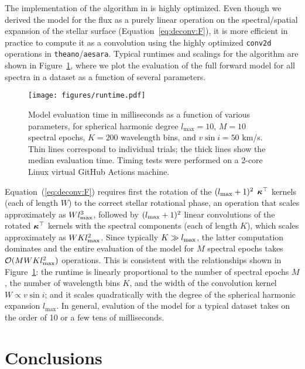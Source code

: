 \documentclass[modern]{aastex631}
\begin{document}
The implementation of the algorithm in \starry is highly optimized.
Even though we derived the model for the flux as a purely linear operation on the spectral/spatial expansion of the stellar surface (Equation~\ref{eq:deconv:F}), it is more  efficient in practice to compute it as a convolution using the highly optimized \texttt{conv2d} operations in \texttt{theano}/\texttt{aesara}.
Typical runtimes and scalings for the \starry algorithm are shown in Figure~\ref{fig:runtime}, where we plot the evaluation of the full forward model for all spectra in a dataset as a function of several parameters.
%
\begin{figure}[t!]
    \begin{centering}
        \texttt{[image: figures/runtime.pdf]}
        \caption{%
            Model evaluation time in milliseconds as a function of various parameters, for spherical harmonic degree $l_\mathrm{max} = 10$, $M = 10$ spectral epochs, $K = 200$ wavelength bins, and $v\sin i = 50$ km/s.
            Thin lines correspond to individual trials; the thick lines show the median evaluation time.
            Timing tests were performed on a 2-core Linux virtual GitHub Actions machine.
        }
        \label{fig:runtime}
    \end{centering}
\end{figure}
%
Equation~(\ref{eq:deconv:F}) requires first the rotation of the $(l_\mathrm{max} + 1)^2$ $\boldsymbol{\kappa}^\top$ kernels (each of length $W$) to the correct stellar rotational phase, an operation that scales approximately as $W l_\mathrm{max}^3$, followed by $(l_\mathrm{max} + 1)^2$ linear convolutions of the rotated $\boldsymbol{\kappa}^\top$ kernels with the spectral components (each of length $K$), which scales approximately as $W K l_\mathrm{max}^2$. 
Since typically $K \gg l_\mathrm{max}$, the latter computation dominates and the entire evaluation of the model for $M$ spectral epochs takes $\mathcal{O}(M W K l_\mathrm{max}^2)$ operations. 
This is consistent with the relationships shown in Figure~\ref{fig:runtime}: the runtime is linearly proportional to the number of spectral epochs $M$, the number of wavelength bins $K$, and the width of the convolution kernel $W \propto v\sin i$; and it scales quadratically with the degree of the spherical harmonic expansion $l_\mathrm{max}$.
In general, evalution of the model for a typical dataset takes on the order of 10 or a few tens of milliseconds.



\section{Conclusions}
\label{sec:conclusions}
%
\end{document}
